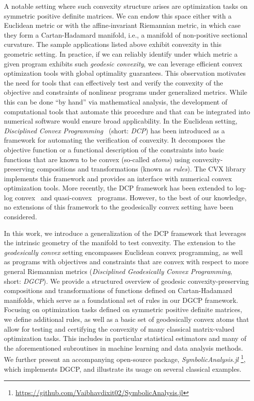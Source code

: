 \documentclass[twoside,11pt]{article}
\begin{document}
A notable setting where such convexity structure arises are optimization tasks on symmetric positive definite matrices. We can endow this space either with a Euclidean metric or with the affine-invariant Riemannian metric, in which case they form a Cartan-Hadamard manifold, i.e., a manifold of non-positive sectional curvature. The sample applications listed above exhibit convexity in this geometric setting. In practice, if we can reliably identify under which metric a given program exhibits such \emph{geodesic convexity}, we can leverage efficient convex optimization tools with global optimality guarantees. This observation motivates the need for tools that can effectively test and verify the convexity of the objective and constraints of nonlinear programs under generalized metrics. While this can be done “by hand” via mathematical analysis, the development of computational tools that automate this procedure and that can be integrated into numerical software would ensure broad applicability. In the Euclidean setting, \emph{Disciplined Convex Programming}~\citep{grant2006disciplined} (short: \emph{DCP}) has been introduced as a framework for automating the verification of convexity. It decomposes the objective function or a functional description of the constraints into basic functions that are known to be convex (so-called \emph{atoms}) using convexity-preserving compositions and transformations (known as \emph{rules}). The CVX library~\citep{diamond2016cvxpy} implements this framework and provides an interface with numerical convex optimization tools. More recently, the DCP framework has been extended to log-log convex~\citep{dgp} and quasi-convex~\citep{dqp} programs. However, to the best of our knowledge, no extensions of this framework to the geodesically convex setting have been considered.

In this work, we introduce a generalization of the DCP framework that leverages the intrinsic geometry of the manifold to test convexity. The extension to the \emph{geodesically convex} setting encompasses Euclidean convex programming, as well as programs with objectives and constraints that are convex with respect to more general Riemannian metrics (\emph{Disciplined Geodesically Convex Programming}, short: \emph{DGCP}). 
We provide a structured overview of geodesic convexity-preserving compositions and transformations of functions defined on Cartan-Hadamard manifolds, which serve as a foundational set of rules in our DGCP framework.
Focusing on optimization tasks defined on symmetric positive definite matrices, we define additional rules, as well as a basic set of geodesically convex atoms that allow for testing and certifying the convexity of many classical matrix-valued optimization tasks. This includes in particular statistical estimators and many of the aforementioned subroutines in machine learning and data analysis methods. We further present an accompanying open-source package, \textsl{SymbolicAnalysis.jl} \footnote{\url{https://github.com/Vaibhavdixit02/SymbolicAnalysis.jl}}, which implements DGCP, and illustrate its usage on several classical examples.
\end{document}
